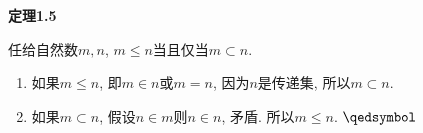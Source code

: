 \vspace{10pt}

\hypertarget{sec:定理1.5}{}
\noindent\textbf{定理1.5}

任给自然数$m,n$, $m\leqslant n$当且仅当$m\subset n$.


\begin{enumerate}
    \item 如果$m\leqslant n$, 即$m\in n$或$m=n$, 因为$n$是传递集, 所以$m\subset n$.
    \item 如果$m\subset n$, 假设$n\in m$则$n\in n$, 矛盾. 所以$m\leqslant n$.
    \hfill $\qedsymbol$
\end{enumerate}

